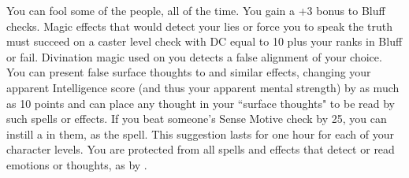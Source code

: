 {You can fool some of the people, all of the time.}
{You gain a +3 bonus to Bluff checks.}
{Magic effects that would detect your lies or force you to speak the truth must succeed on a caster level check with DC equal to 10 plus your ranks in Bluff or fail.}
{Divination magic used on you detects a false alignment of your choice. You can present false surface thoughts to  and similar effects, changing your apparent Intelligence score (and thus your apparent mental strength) by as much as 10 points and can place any thought in your ``surface thoughts" to be read by such spells or effects.}
{If you beat someone's Sense Motive check by 25, you can instill a  in them, as the spell. This suggestion lasts for one hour for each of your character levels.}
{You are protected from all spells and effects that detect or read emotions or thoughts, as by .}
